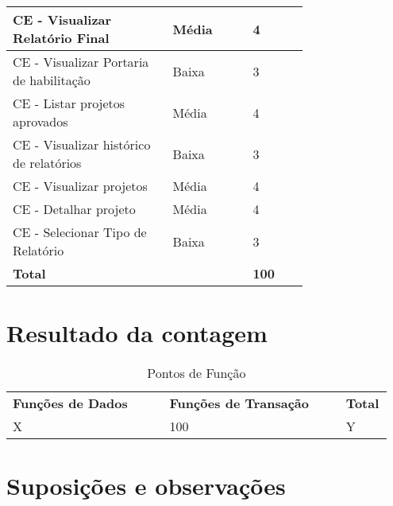 \begin{table*}[!h]
\begin{tabular}{|p{0.40\linewidth}|p{0.20\linewidth}|p{0.14\linewidth}|}
	  CE - Visualizar Relatório Final & Média&4 \\ \hline
	  CE - Visualizar Portaria de habilitação &Baixa & 3\\ \hline
	  CE - Listar projetos aprovados & Média& 4\\ \hline
	  CE - Visualizar histórico de relatórios & Baixa& 3\\ \hline
	  CE - Visualizar projetos & Média& 4\\ \hline
	  CE - Detalhar projeto & Média& 4\\ \hline
	  CE - Selecionar Tipo de Relatório &Baixa & 3\\ \hline
	  \multicolumn{2}{|l|}{\textbf{Total}} & \textbf{100} \\
	\hline
	\end{tabular}
	\end{table*}

\vfill
\pagebreak
\section{Resultado da contagem}

\begin{table*}[!h]
\centering
\caption{Pontos de Função}
\label{resultado_contagem}
  \begin{tabular}{|p{0.40\linewidth}|p{0.45\linewidth}|p{0.10\linewidth}|}
  \hline
  \textbf{Funções de Dados} & \textbf{Funções de Transação} & \textbf{Total} \\ 
  X & 100 & Y\\
  \hline
 
  \end{tabular}
\end{table*}

\section{Suposições e observações}

